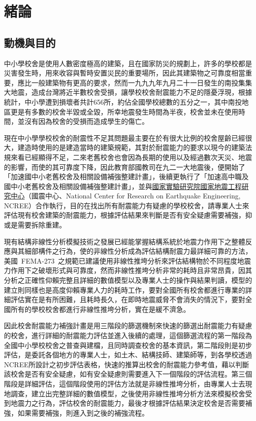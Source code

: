 % 
\chapter{緒論}
\label{cha:intro} 

\section{動機與目的}

中小學校舍是使用人數密度極高的建築，且在國家防災的規劃上，許多的學校都是災害發生時，用來收容與暫時安置災民的重要場所，因此其建築物之可靠度相當重要，應比一般建築物有更高的要求，然而一九九九年九月二十一日發生的南投集集大地震，造成台灣將近半數校舍受損，讓學校校舍耐震能力不足的隱憂浮現，根據統計，中小學遭到損壞者共計656所，約佔全國學校總數的五分之一，其中南投地區更是有多數的校舍半毀或全毀，所幸地震發生時間為半夜，校舍並未在使用時間，並沒有因為校舍的受損而造成學生的傷亡。

現在中小學學校校舍的耐震性不足其問題最主要在於有很大比例的校舍屋齡已經很大，建造時使用的是建造當時的建築規範，其對於耐震能力的要求以現今的建築法規來看已經顯得不足，二來老舊校舍也會因為長期的使用以及經過數次天災、地震的影響，而使的其可靠度下降，因此教育部國教司在九二一大地震後，便開始了「加速國中小老舊校舍及相關設備補強整建計畫」，後續更執行了「加速高中職及國中小老舊校舍及相關設備補強整建計畫」，並與\underline{國家實驗研究院國家地震工程研究中心}（國震中心、National Center for Research on Earthquake Engineering, NCREE）合作執行，目的在找出所有耐震能力有疑慮的學校校舍，請專業人士來評估現有校舍建築的耐震能力，根據評估結果來判斷是否有安全疑慮需要補強，抑或是需要拆除重建。

現有結構非線性分析模擬技術之發展已經能掌握結構系統於地震力作用下之整體反應與其細部構件之行為，使的非線性分析成為評估結構耐震力最詳細可靠的方法，美國~FEMA-273\cite{building1997nehrp}~之規範已建議使用非線性推垮分析來評估結構物於不同程度地震力作用下之破壞形式與可靠度，然而非線性推垮分析非常的耗時且非常昂貴，因其分析之正確性仰賴完整且詳細的數值模型以及專業人士的操作與結果判讀，模型的建立則同樣也是高度仰賴專業人力的耗時工作，要對全國所有校舍都進行專業的詳細評估實在是有所困難，且耗時長久，在即時地震威脅不會消失的情況下，要對全國所有的學校校舍都進行非線性推垮分析，實在是緩不濟急。

因此校舍耐震能力補強計畫是用三階段的篩選機制來快速的篩選出耐震能力有疑慮的校舍，進行詳細的耐震能力評估並進入後續的處理，這個篩選流程的第一階段為全國中小學校校舍之普查與建檔，且同時調查校舍的基本資訊，第二階段則是初步評估，是委託各個地方的專業人士，如土木、結構技師、建築師等，到各學校透過NCREE所設計之初步評估表格，快速的推算出校舍的耐震能力參考值，藉以判斷該校舍是否有安全疑慮，如有安全疑慮則需要進入下一個階段的評估流程。第三個階段是詳細評估，這個階段使用的評估方法就是非線性推垮分析，由專業人士去現地調查，建立出完整詳細的數值模型，之後使用非線性推垮分析方法來模擬校舍受到地震力之行為，評估校舍的耐震能力，最後才根據評估結果決定校舍是否需要補強，如果需要補強，則進入到之後的補強流程。

